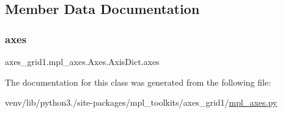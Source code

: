 \subsection{Member Data Documentation}
\mbox{\label{classaxes__grid1_1_1mpl__axes_1_1Axes_1_1AxisDict_a5d41ba97269050669864f4c67e35d66e}} 
\subsubsection{\texorpdfstring{axes}{axes}}
{\footnotesize\ttfamily axes\+\_\+grid1.\+mpl\+\_\+axes.\+Axes.\+Axis\+Dict.\+axes}



The documentation for this class was generated from the following file\+:\begin{DoxyCompactItemize}
\item 
venv/lib/python3./site-\/packages/mpl\+\_\+toolkits/axes\+\_\+grid1/\hyperlink{mpl__axes_8py}{mpl\+\_\+axes.\+py}\end{DoxyCompactItemize}
